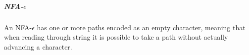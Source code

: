 \documentclass[11pt]{article}
\begin{document}
	\subparagraph{NFA-$\epsilon$} An NFA-$\epsilon$ has one or more paths encoded as an empty character, meaning that when reading through string it is possible to take a path without actually advancing a character.

%		
%		


\end{document}
